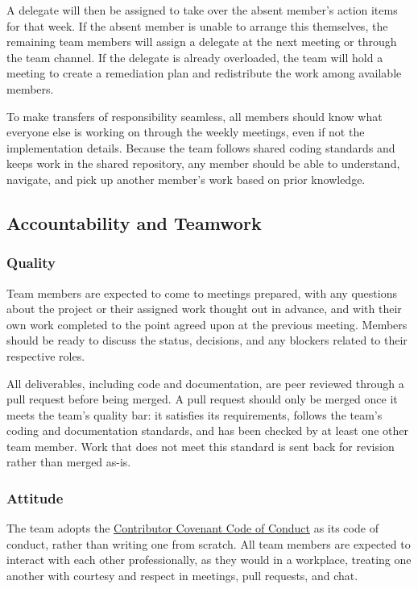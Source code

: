 \documentclass{article}
\begin{document}
A delegate will then be assigned to take over the absent member's action items for that week. If the absent member is unable to 
arrange this themselves, the remaining team members will assign a delegate at the next meeting or through the team channel. 
If the delegate is already overloaded, the team will hold a meeting to create a remediation plan and redistribute the work among available members. 

To make transfers of responsibility seamless, all members should know what everyone else is working on through the weekly meetings, 
even if not the implementation details. Because the team follows shared coding standards and keeps work in the shared repository, 
any member should be able to understand, navigate, and pick up another member's work based on prior knowledge.

\subsection*{Accountability and Teamwork}

\subsubsection*{Quality}

Team members are expected to come to meetings prepared, with any questions about the
project or their assigned work thought out in advance, and with their own work
completed to the point agreed upon at the previous meeting. Members should be ready
to discuss the status, decisions, and any blockers related to their respective roles.

All deliverables, including code and documentation, are peer reviewed through a pull
request before being merged. A pull request should only be merged once it meets the
team's quality bar: it satisfies its requirements, follows the team's coding and
documentation standards, and has been checked by at least one other team member.
Work that does not meet this standard is sent back for revision rather than merged
as-is.

\subsubsection*{Attitude}

The team adopts the
\href{https://www.contributor-covenant.org/}{Contributor Covenant Code of Conduct}
as its code of conduct, rather than writing one from scratch. All team members are
expected to interact with each other professionally, as they would in a workplace,
treating one another with courtesy and respect in meetings, pull requests, and chat.
\end{document}
